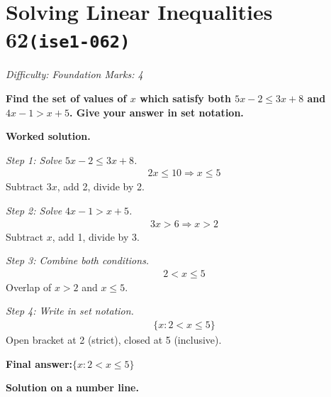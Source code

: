 \documentclass[11pt]{article}
\newcommand{\question}[1]{\par\medskip\noindent\textbf{#1}\par}
\begin{document}
\section*{Solving Linear Inequalities 62\quad\small\texttt{(ise1-062)}}
\textit{Difficulty: Foundation \quad\textbar\quad Marks: 4}

\question{Find the set of values of \( x \) which satisfy both \( 5x - 2 \leq 3x + 8 \) and \( 4x - 1 > x + 5 \). Give your answer in set notation.}

\textbf{Worked solution.}

\textit{Step 1: Solve \( 5x - 2 \leq 3x + 8 \).}
\[\begin{gathered}
2x \leq 10 \Rightarrow x \leq 5
\end{gathered}\]
Subtract \( 3x \), add 2, divide by 2.

\textit{Step 2: Solve \( 4x - 1 > x + 5 \).}
\[\begin{gathered}
3x > 6 \Rightarrow x > 2
\end{gathered}\]
Subtract \( x \), add 1, divide by 3.

\textit{Step 3: Combine both conditions.}
\[\begin{gathered}
2 < x \leq 5
\end{gathered}\]
Overlap of \( x > 2 \) and \( x \leq 5 \).

\textit{Step 4: Write in set notation.}
\[\begin{gathered}
\{x : 2 < x \leq 5\}
\end{gathered}\]
Open bracket at 2 (strict), closed at 5 (inclusive).

\begin{answerbox}
\textbf{Final answer:}\quad \(\displaystyle  \{x : 2 < x \leq 5\} \)
\end{answerbox}
\textbf{Solution on a number line.}
\end{document}
